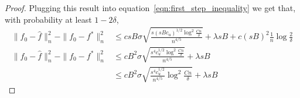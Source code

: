 \begin{proof}

Plugging this result into equation~\eqref{eqn:first_step_inequality}
we get that, with probability at least $1 - 2\delta$,
\begin{align}
\|f_0 - \hat{f} \|_n^2 - \| f_0 - f^* \|_n^2 
   &\leq c sB \sigma \sqrt{ 
   \frac{s (sBc_u)^{1/2} \log^2 \frac{Cn}{\delta}}{n^{4/5}}}
   + \lambda s B + c (sB)^2 \frac{1}{n} \log \frac{2}{\delta} \nonumber\\
\|f_0 - \hat{f} \|_n^2 - \| f_0 - f^* \|_n^2 
   &\leq c B^2 \sigma \sqrt{ 
   \frac{s^4 c_u^{1/2} \log^2 \frac{Cn}{\delta}}{n^{4/5}}}
   + \lambda s B \nonumber\\   
   &\leq c B^2 \sigma 
    \sqrt{ \frac{s^4 c_u^{1/2}}{n^{4/5}} \log^2 \frac{Cn}{\delta}} + \lambda sB
\label{eqn:second_step_inequality}
\end{align}





\end{proof}
